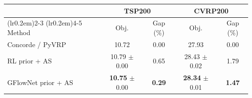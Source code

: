 \begin{tabular}{lcccc}
\toprule[1.0pt]
\multicolumn{1}{c}{} & \multicolumn{2}{c}{TSP200} & \multicolumn{2}{c}{CVRP200}\\
\cmidrule[0.5pt](lr{0.2em}){2-3}
\cmidrule[0.5pt](lr{0.2em}){4-5}
Method & Obj. & Gap (\%) & Obj. & Gap (\%) \\
\midrule
Concorde / PyVRP & 10.72 & 0.00 & 27.93 & 0.00 \\
\midrule
RL prior + AS & 10.79  \footnotesize{$\pm$ 0.00} & 0.65 & 28.43 \footnotesize{$\pm$ 0.02} & 1.79 \\
GFlowNet prior + AS & \textbf{10.75}  \footnotesize{$\pm$ 0.00} & \textbf{0.29} & \textbf{28.34} \footnotesize{$\pm$ 0.01} & \textbf{1.47} \\
\bottomrule
\end{tabular}